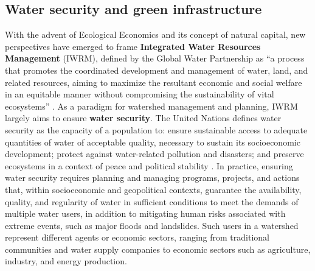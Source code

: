 \documentclass[./main_en.tex]{subfiles}
\begin{document}
\subsection{Water security and green infrastructure} \label{sec:watersheds:watersecurity}

\par With the advent of Ecological Economics and its concept of natural capital, new perspectives have emerged to frame \textbf{Integrated Water Resources Management} (IWRM), defined by the Global Water Partnership as “a process that promotes the coordinated development and management of water, land, and related resources, aiming to maximize the resultant economic and social welfare in an equitable manner without compromising the sustainability of vital ecosystems” \cite{GWP2000}. As a paradigm for watershed management and planning, IWRM largely aims to ensure \textbf{water security}. The United Nations defines water security as the capacity of a population to: ensure sustainable access to adequate quantities of water of acceptable quality, necessary to sustain its socioeconomic development; protect against water-related pollution and disasters; and preserve ecosystems in a context of peace and political stability \cite{cassin2021}. In practice, ensuring water security requires planning and managing programs, projects, and actions that, within socioeconomic and geopolitical contexts, guarantee the availability, quality, and regularity of water in sufficient conditions to meet the demands of multiple water users, in addition to mitigating human risks associated with extreme events, such as major floods and landslides. Such users in a watershed represent different agents or economic sectors, ranging from traditional communities and water supply companies to economic sectors such as agriculture, industry, and energy production.
\end{document}
